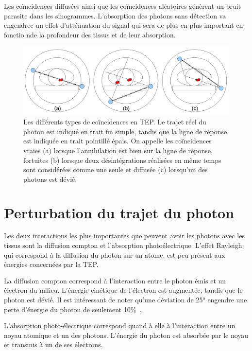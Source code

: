 Les coïncidences diffusées ainsi que les coïncidences aléatoires génèrent un bruit parasite dans les sinogrammes. L'absorption des photons sans détection va engendree un effet d'atténuation du signal qui sera de plus en plus important en fonctio nde la profondeur des tissus et de leur absorption.


\begin{figure}
\centering
\includegraphics[width=12cm]{images/schemaDetections}
\caption[Les différents types de coïncidences en TEP]{Les différents types de coïncidences en TEP. Le trajet réel du photon est indiqué en trait fin simple, tandis que la ligne de réponse est indiquée en trait pointillé épais. On appelle les coïncidences vraies (a) lorsque l'annihilation est bien sur la ligne de réponse, fortuites (b) lorsque deux désintégrations réalisées en même temps sont considérées comme une seule et diffusée (c) lorsqu'un des photons est dévié.}
\label{fig:schemaDetections}
\end{figure}



	\section{Perturbation du trajet du photon}

Les deux interactions les plus importantes que peuvent avoir les photons avec les tissus sont la diffusion compton et l'absorption photoélectrique. L'effet Rayleigh, qui correspond à la diffusion du photon sur un atome, est peu présent aux énergies concernées par la TEP. 

La diffusion compton correspond à l'interaction entre le photon émis et un électron du milieu. L'énergie cinétique de l'électron est augmentée, tandis que le photon est dévié. Il est intéressant de noter qu'une déviation de 25° engendre une perte d'énergie du photon de seulement 10\%~\cite{evans1955atomic}.

L'absorption photo-électrique correspond quand à elle à l'interaction entre un noyau atomique et un des photons. L'énergie du photon est absorbée par le noyau et transmis à un de ses électrons. 

